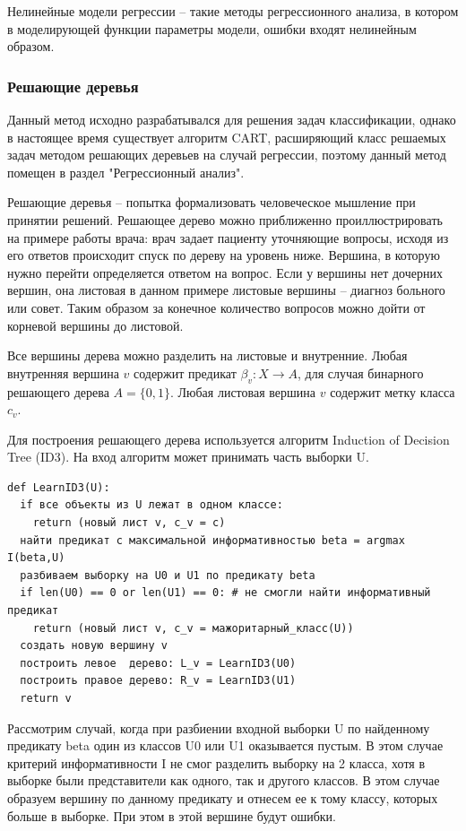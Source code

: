 Нелинейные модели регрессии -- такие методы регрессионного анализа, в котором в моделирующей функции параметры модели, ошибки входят нелинейным образом.


\subsubsection{Решающие деревья}

Данный метод исходно разрабатывался для решения задач классификации, однако в настоящее время существует алгоритм CART, расширяющий класс решаемых задач методом решающих деревьев на случай регрессии, поэтому данный метод помещен в раздел "Регрессионный анализ".

Решающие деревья -- попытка формализовать человеческое мышление при принятии решений. Решающее дерево можно приближенно проиллюстрировать на примере работы врача: врач задает пациенту уточняющие вопросы, исходя из его ответов происходит спуск по дереву на уровень ниже. Вершина, в которую нужно перейти определяется ответом на вопрос. Если у вершины нет дочерних вершин, она листовая в данном примере листовые вершины -- диагноз больного или совет. Таким образом за конечное количество вопросов можно дойти от корневой вершины до листовой.

Все вершины дерева можно разделить на листовые и внутренние. Любая внутренняя вершина $v$ содержит предикат $\beta_v : X \rightarrow A$, для случая бинарного решающего дерева $A = \{0, 1\}$. Любая листовая вершина $v$ содержит метку класса $c_v$.

Для построения решающего дерева используется алгоритм Induction of Decision Tree (ID3). На вход алгоритм может принимать часть выборки U.

\begin{code}
\begin{verbatim}
def LearnID3(U):
  if все объекты из U лежат в одном классе:
    return (новый лист v, c_v = c)
  найти предикат с максимальной информативностью beta = argmax I(beta,U)
  разбиваем выборку на U0 и U1 по предикату beta
  if len(U0) == 0 or len(U1) == 0: # не смогли найти информативный предикат
    return (новый лист v, c_v = мажоритарный_класс(U))
  создать новую вершину v
  построить левое  дерево: L_v = LearnID3(U0)
  построить правое дерево: R_v = LearnID3(U1)
  return v
\end{verbatim}
\label{code:ID3}
\end{code}


Рассмотрим случай, когда при разбиении входной выборки U по найденному предикату beta один из классов U0 или U1 оказывается пустым. В этом случае критерий информативности I не смог разделить выборку на 2 класса, хотя в выборке были представители как одного, так и другого классов. В этом случае образуем вершину по данному предикату и отнесем ее к тому классу, которых больше в выборке. При этом в этой вершине будут ошибки.


